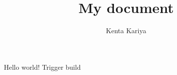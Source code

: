 \documentclass[a4paper,12pt]{article}
\title{My document}
\author{Kenta Kariya}
\begin{document}
Hello world!
Trigger build
\end{document}
